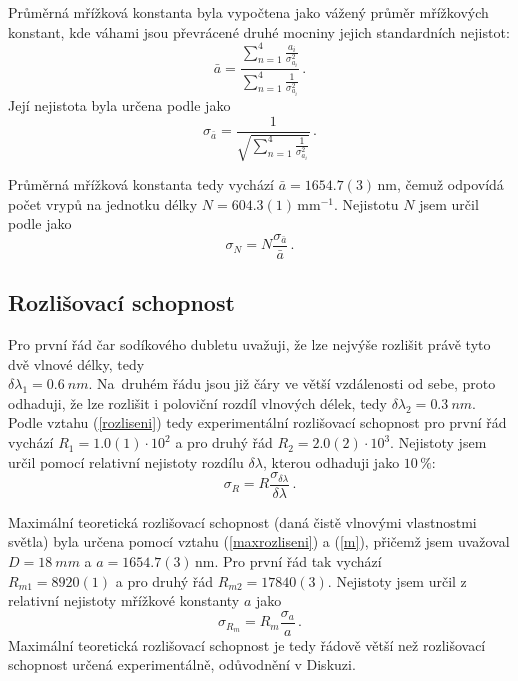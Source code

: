 \documentclass{../concepts/titul_protokol_p/prepareprotokol} %
\newcommand{\relative}[1]{
\frac{\sigma_{#1}}{#1}
}
\begin{document}
Průměrná mřížková konstanta byla vypočtena jako vážený průměr
mřížkových konstant, kde váhami jsou převrácené druhé mocniny
jejich standardních nejistot:
\begin{equation}\label{abar}
    \bar{a} = \frac{\sum_{n=1}^{4}\frac{a_i}{\sigma_{a_i}^2} }{\sum_{n=1}^{4}\frac{1}{\sigma_{a_i}^2}} \, .
\end{equation}
Její nejistota byla určena podle \cite{englich} jako
\begin{equation}\label{sigmaabar}
    \sigma_{\bar{a}} = \frac{1}{\sqrt{\sum_{n=1}^{4}\frac{1}{\sigma_{a_i}^2}}} \, .
\end{equation}

Průměrná mřížková konstanta tedy vychází $\bar{a} = 1654.7(3)\,\mathrm{nm}$,
čemuž odpovídá počet vrypů na jednotku délky $N = 604.3(1)\,\mathrm{mm^{-1}}$. Nejistotu
$N$ jsem určil podle \cite{englich} jako
\begin{equation}\label{sigmaN}
    \sigma_N = N \relative{\bar{a}} \, .
\end{equation}

\subsection{Rozlišovací schopnost}

Pro první řád čar sodíkového dubletu uvažuji, že lze nejvýše rozlišit právě tyto dvě vlnové délky, tedy
\\ $\delta \lambda_1 = \qty{0.6}{nm}$. Na~druhém řádu jsou již čáry ve větší vzdálenosti od sebe, proto odhaduji,
že lze rozlišit i poloviční rozdíl vlnových délek, tedy $\delta \lambda_2 = \qty{0.3}{nm}$. Podle vztahu
(\ref{rozliseni}) tedy experimentální rozlišovací schopnost pro první řád vychází $R_1 = 1.0(1) \cdot 10^2$
a pro druhý řád $R_2 = 2.0(2) \cdot 10^3$. Nejistoty jsem určil pomocí relativní nejistoty rozdílu $\delta \lambda$,
kterou odhaduji jako $10 \, \%$:
\begin{equation}\label{sigmaR}
    \sigma_R = R \relative{\delta \lambda} \, .
\end{equation}

Maximální teoretická rozlišovací schopnost (daná čistě vlnovými vlastnostmi světla) byla určena pomocí vztahu 
(\ref{maxrozliseni}) a (\ref{m}), přičemž jsem uvažoval $D = \qty{18}{mm}$ a $a = 1654.7(3)\,\mathrm{nm}$.
Pro první řád tak vychází \\ $R_{m1} = 8920(1)$ a pro druhý řád $R_{m2} = 17840(3)$.
Nejistoty jsem určil z relativní nejistoty mřížkové konstanty $a$ jako
\begin{equation}\label{sigmaRm}
    \sigma_{R_m} = R_m \relative{a} \, .
\end{equation}
Maximální teoretická rozlišovací schopnost je tedy řádově větší než rozlišovací
schopnost určená experimentálně, odůvodnění v Diskuzi.
\end{document}
